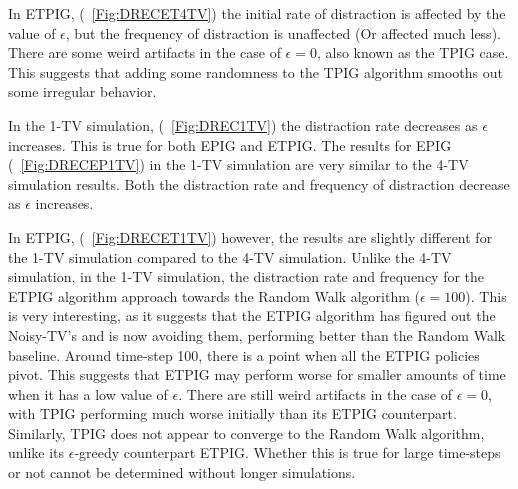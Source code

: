 \documentclass[12pt]{thesis}
\begin{document}
In ETPIG, (\figurename~\ref{Fig:DRECET4TV}) the initial rate of distraction is affected by the value of $\epsilon$, but the frequency of distraction is unaffected (Or affected much less). There are some weird artifacts in the case of $\epsilon = 0$, also known as the TPIG case. This suggests that adding some randomness to the TPIG algorithm smooths out some irregular behavior.

In the 1-TV simulation, (\figurename~\ref{Fig:DREC1TV}) the distraction rate decreases as $\epsilon$ increases. This is true for both EPIG and ETPIG. The results for EPIG (\figurename~\ref{Fig:DRECEP1TV}) in the 1-TV simulation are very similar to the 4-TV simulation results. Both the distraction rate and frequency of distraction decrease as $\epsilon$ increases.

In ETPIG, (\figurename~\ref{Fig:DRECET1TV}) however, the results are slightly different for the 1-TV simulation compared to the 4-TV simulation. Unlike the 4-TV simulation, in the 1-TV simulation, the distraction rate and frequency for the ETPIG algorithm approach towards the Random Walk algorithm ($\epsilon = 100$). This is very interesting, as it suggests that the ETPIG algorithm has figured out the Noisy-TV's and is now avoiding them, performing better than the Random Walk baseline. Around time-step 100, there is a point when all the ETPIG policies pivot. This suggests that ETPIG may perform worse for smaller amounts of time when it has a low value of $\epsilon$. There are still weird artifacts in the case of $\epsilon = 0$, with TPIG performing much worse initially than its ETPIG counterpart. Similarly, TPIG does not appear to converge to the Random Walk algorithm, unlike its $\epsilon$-greedy counterpart ETPIG. Whether this is true for large time-steps or not cannot be determined without longer simulations. 
\end{document}
